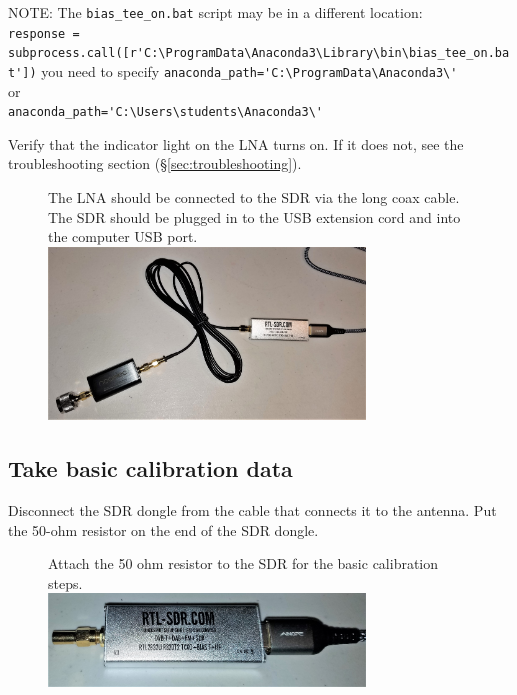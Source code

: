 \documentclass[11pt]{article}
\begin{document}
NOTE: The \verb|bias_tee_on.bat| script may be in a different location:\\
\verb|response = subprocess.call([r'C:\ProgramData\Anaconda3\Library\bin\bias_tee_on.bat'])|
you need to specify \verb|anaconda_path='C:\ProgramData\Anaconda3\'|\\
or\\
\verb|anaconda_path='C:\Users\students\Anaconda3\'|


Verify that the indicator light on the LNA turns on.
If it does not, see the troubleshooting section (\S \ref{sec:troubleshooting}).

\begin{figure}[htp]
    \centering
    The LNA should be connected to the SDR via the long coax cable.  The SDR should be plugged in
    to the USB extension cord and into the computer USB port.\\
    \includegraphics[width=0.75\textwidth]{RadioLabPhotos/adapter_to_lna_to_cable_to_sdr.jpg}
\end{figure}

\subsection{Take basic calibration data}
Disconnect the SDR dongle from the cable that connects it to the antenna.
Put the 50-ohm resistor on the end of the SDR dongle.

\begin{figure}[htp]
    \centering
    Attach the 50 ohm resistor to the SDR for the basic calibration steps. \\
\includegraphics[width=0.75\textwidth]{RadioLabPhotos/sdr_with_resistor.jpg}
\end{figure}
\end{document}
